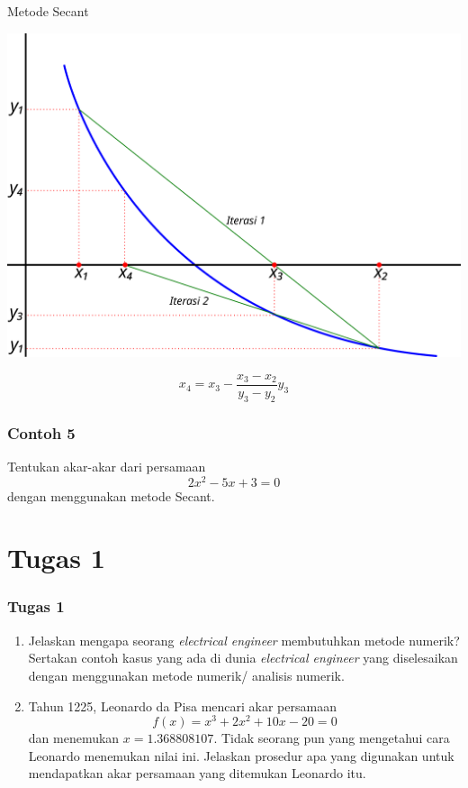 \documentclass[pdflatex,compress,mathserif]{beamer}
\begin{document}
\begin{frame}{Metode Secant}
	\begin{center}
		\includegraphics[width=0.7\linewidth]{img/05}
	\end{center}
	$$ x_4 = x_{3} - \frac{x_{3}-x_{2}}{y_{3}-y_{2}}y_{3} $$
\end{frame}

\begin{frame}
	\frametitle{Contoh 5}
	Tentukan akar-akar dari persamaan $$ 2x^2 - 5x + 3 = 0 $$ dengan menggunakan metode Secant.
\end{frame}

\section{Tugas 1}

\begin{frame}
	\frametitle{Tugas 1}
	\begin{enumerate}
		\item Jelaskan mengapa seorang \textit{electrical engineer} membutuhkan metode numerik? Sertakan contoh kasus yang ada di dunia \textit{electrical engineer} yang diselesaikan dengan menggunakan metode numerik/ analisis numerik.
		\item Tahun 1225, Leonardo da Pisa mencari akar persamaan
		$$ f(x) = x^3 + 2x^2 + 10x - 20 = 0 $$
		dan menemukan $ x = 1.368808107 $. Tidak seorang pun yang mengetahui cara
		Leonardo menemukan nilai ini. Jelaskan prosedur apa yang digunakan untuk mendapatkan  akar persamaan yang ditemukan Leonardo itu.
	\end{enumerate}
\end{frame}
\end{document}
